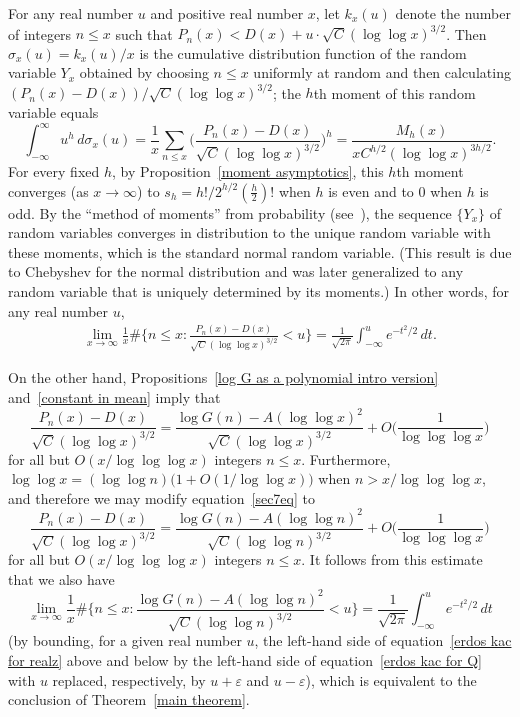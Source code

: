 \documentclass[12pt,reqno]{amsart}
\theoremstyle{definition}
\newcommand{\ep}{\varepsilon}
\begin{document}
For any real number $u$ and positive real number $x$, let $k_x(u)$ denote the number of integers $n \leq x$ such that
$P_n(x) < D(x) + u \cdot \sqrt{C}(\log\log x)^{3/2}$.
Then $\sigma_x(u) = k_x(u)/x$ is the cumulative distribution function of the random variable $Y_x$ obtained by choosing $n\le x$ uniformly at random and then calculating $(P_n(x) - D(x))/\sqrt{C}(\log\log x)^{3/2}$; the $h$th moment of this random variable equals
\[
\int_{-\infty}^\infty u^h \,d\sigma_x(u) = \frac{1}{x} \sum_{n \leq x} \bigg( \frac{P_n(x) - D(x)}{\sqrt C(\log\log x)^{3/2}} \bigg)^h = \frac{M_h(x)}{x C^{h/2} ( \log\log x )^{3h/2}}.
\]
For every fixed $h$, by Proposition~\ref{moment asymptotics}, this $h$th moment converges (as $x\to\infty$) to $s_h = h!/2^{h/2}(\frac h2)!$ when $h$ is even and to $0$ when $h$ is odd. By the ``method of moments'' from probability (see~\cite[Theorem 30.2]{bil86}), the sequence $\{Y_x\}$ of random variables converges in distribution to the unique random variable with these moments, which is the standard normal random variable. (This result is due to Chebyshev for the normal distribution and was later generalized to any random variable that is uniquely determined by its moments.)
In other words, for any real number $u$,
\begin{align}\label{erdos kac for Q}
\lim_{x \to \infty} \frac{1}{x} \#\bigg\{n \leq x \colon \frac{P_n(x) - D(x)}{\sqrt C(\log\log x)^{3/2}} < u \bigg\} = \frac{1}{\sqrt{2\pi}} \int_{-\infty}^u e^{-t^2/2} \, dt.
\end{align}

On the other hand, Propositions~\ref{log G as a polynomial intro version} and~\ref{constant in mean} imply that
\begin{equation} \label{sec7eq}
\frac{P_n(x) - D(x)}{\sqrt C(\log\log x)^{3/2}} = \frac{\log G(n) - A(\log\log x)^2}{\sqrt C(\log\log x)^{3/2}} + O\bigg( \frac1{\log\log\log x} \bigg)
\end{equation}
for all but $O(x/\log\log\log x)$ integers $n \leq x$. Furthermore, $\log\log x = (\log\log n) \big(1 + O(1/\log\log x) \big)$ when $n>x/\log\log\log x$, and therefore we may modify equation~\eqref{sec7eq} to
\begin{equation*}
\frac{P_n(x) - D(x)}{\sqrt C(\log\log x)^{3/2}} = \frac{\log G(n) - A(\log\log n)^2}{\sqrt C(\log\log n)^{3/2}} + O\bigg( \frac1{\log\log\log x} \bigg)
\end{equation*}
for all but $O(x/\log\log\log x)$ integers $n \leq x$.
It follows from this estimate that we also have
\begin{equation}  \label{erdos kac for realz}
\lim_{x \to \infty} \frac{1}{x} \#\bigg\{n \leq x \colon \frac{\log G(n) - A(\log\log n)^2}{\sqrt C(\log\log n)^{3/2}} < u \bigg\} = \frac{1}{\sqrt{2\pi}} \int_{-\infty}^u e^{-t^2/2} \, dt
\end{equation}
(by bounding, for a given real number $u$, the left-hand side of equation~\eqref{erdos kac for realz} above and below by the left-hand side of equation~\eqref{erdos kac for Q} with $u$ replaced, respectively, by $u+\ep$ and $u-\ep$), which is equivalent to the conclusion of Theorem~\ref{main theorem}.
\end{document}
